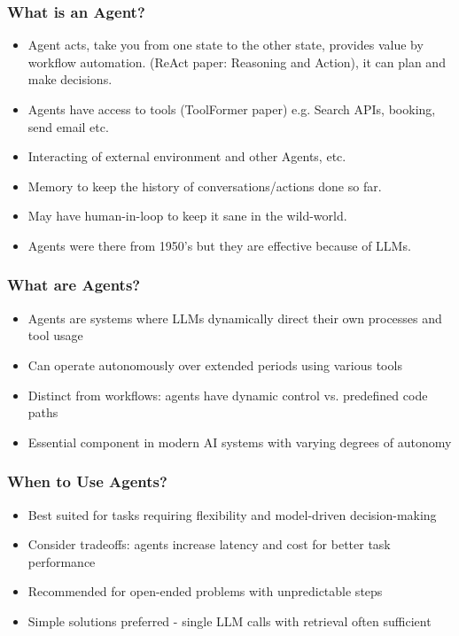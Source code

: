 \begin{frame}[fragile]\frametitle{What is an Agent?}
    \begin{itemize}
        \item Agent acts, take you from one state to the other state, provides value by workflow automation. (ReAct paper: Reasoning and Action), it can plan and make decisions.
		\item Agents have access to tools (ToolFormer paper) e.g. Search APIs, booking, send email etc.
		\item Interacting of external environment and other Agents, etc.
		\item Memory to keep the history of conversations/actions done so far.
		\item May have human-in-loop to keep it sane in the wild-world.
		\item Agents were there from 1950's but they are effective because of LLMs.
    \end{itemize}
\end{frame}

\begin{frame}[fragile]\frametitle{What are Agents?}
    \begin{itemize}
        \item Agents are systems where LLMs dynamically direct their own processes and tool usage
        \item Can operate autonomously over extended periods using various tools
        \item Distinct from workflows: agents have dynamic control vs. predefined code paths
        \item Essential component in modern AI systems with varying degrees of autonomy
    \end{itemize}
\end{frame}

\begin{frame}[fragile]\frametitle{When to Use Agents?}
    \begin{itemize}
        \item Best suited for tasks requiring flexibility and model-driven decision-making
        \item Consider tradeoffs: agents increase latency and cost for better task performance
        \item Recommended for open-ended problems with unpredictable steps
        \item Simple solutions preferred - single LLM calls with retrieval often sufficient
    \end{itemize}
\end{frame}

